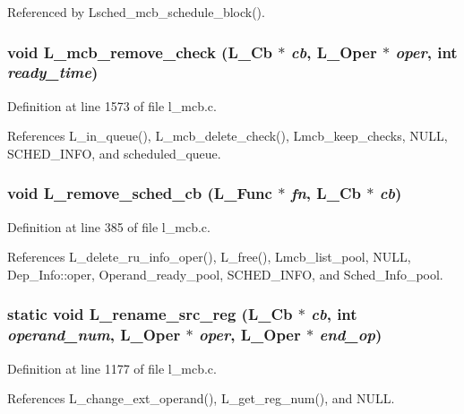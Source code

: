Referenced by Lsched\_\-mcb\_\-schedule\_\-block().
\subsubsection{\setlength{\rightskip}{0pt plus 5cm}void L\_\-mcb\_\-remove\_\-check (L\_\-Cb $\ast$ {\em cb}, L\_\-Oper $\ast$ {\em oper}, int {\em ready\_\-time})}\label{l__mcb_8c_86fbe77057384630ecf6336d91ed3fc5}




Definition at line 1573 of file l\_\-mcb.c.

References L\_\-in\_\-queue(), L\_\-mcb\_\-delete\_\-check(), Lmcb\_\-keep\_\-checks, NULL, SCHED\_\-INFO, and scheduled\_\-queue.
\subsubsection{\setlength{\rightskip}{0pt plus 5cm}void L\_\-remove\_\-sched\_\-cb (L\_\-Func $\ast$ {\em fn}, L\_\-Cb $\ast$ {\em cb})}\label{l__mcb_8c_ec6ec3dd6c6b7e836560d4ae0ef698b1}




Definition at line 385 of file l\_\-mcb.c.

References L\_\-delete\_\-ru\_\-info\_\-oper(), L\_\-free(), Lmcb\_\-list\_\-pool, NULL, Dep\_\-Info::oper, Operand\_\-ready\_\-pool, SCHED\_\-INFO, and Sched\_\-Info\_\-pool.
\subsubsection{\setlength{\rightskip}{0pt plus 5cm}static void L\_\-rename\_\-src\_\-reg (L\_\-Cb $\ast$ {\em cb}, int {\em operand\_\-num}, L\_\-Oper $\ast$ {\em oper}, L\_\-Oper $\ast$ {\em end\_\-op})\hspace{0.3cm}{\tt  [static]}}\label{l__mcb_8c_50bea1902b546b8d39ad9ce49e97db0a}




Definition at line 1177 of file l\_\-mcb.c.

References L\_\-change\_\-ext\_\-operand(), L\_\-get\_\-reg\_\-num(), and NULL.

